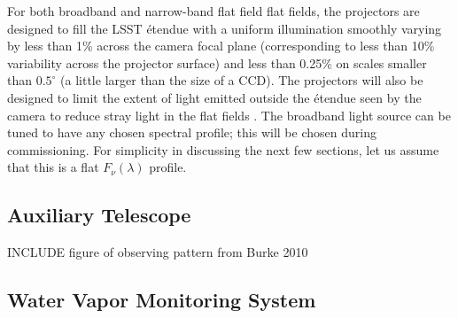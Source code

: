 \documentclass[12pt,preprint]{aastex}
\begin{document}
For both broadband and narrow-band flat field flat fields, the
projectors are designed to fill the LSST \'{e}tendue with a uniform
illumination smoothly varying by less than 1\% across the camera focal
plane (corresponding to less than 10\% variability across the
projector surface) and less than 0.25\% on scales smaller than
$0.5^{\circ}$ (a little larger than the size of a CCD). The projectors
will also be designed to limit the extent of light emitted outside the
\'{e}tendue seen by the camera to reduce stray light in the flat
fields \citep{Gressler2010}. The broadband light source can be tuned
to have any chosen spectral profile; this will be chosen during
commissioning. For simplicity in discussing the next few sections, let
us assume that this is a flat $F_\nu(\lambda)$ profile.

\subsection{Auxiliary Telescope}

INCLUDE figure of observing pattern from Burke 2010

\subsection{Water Vapor Monitoring System}
\end{document}
